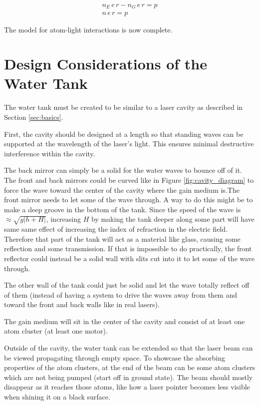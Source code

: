 \documentclass[12pt]{article}
\begin{document}
\begin{eqnarray}
    n_E\,e\,r -n_G\,e\,r = p
    \\
    n\,e\,r = p
\end{eqnarray}

The model for atom-light interactions is now complete.

\section{Design Considerations of the Water Tank}\label{sec:tank-design}

The water tank must be created to be similar to a laser cavity as described in Section \ref{sec:basics}.

First, the cavity should be designed at a length so that standing waves can be supported at the wavelength of the laser's light. This ensures minimal destructive interference within the cavity.

The back mirror can simply be a solid for the water waves to bounce off of it. The front and back mirrors could be curved like in Figure \ref{fig:cavity_diagram} to force the wave toward the center of the cavity where the gain medium is.The front mirror needs to let some of the wave through. A way to do this might be to make a deep groove in the bottom of the tank. Since the speed of the wave is $\approx \sqrt{g |h+H|}$, increasing $H$ by making the tank deeper along some part will have same same effect of increasing the index of refraction in the electric field. Therefore that part of the tank will act as a material like glass, causing some reflection and some transmission. If that is impossible to do practically, the front reflector could instead be a solid wall with slits cut into it to let some of the wave through.

The other wall of the tank could just be solid and let the wave totally reflect off of them (instead of having a system to drive the waves away from them and toward the front and back walls like in real lasers).

The gain medium will sit in the center of the cavity and consist of at least one atom cluster (at least one motor).

Outside of the cavity, the water tank can be extended so that the laser beam can be viewed propagating through empty space. To showcase the absorbing properties of the atom clusters, at the end of the beam can be some atom clusters which are not being pumped (start off in ground state). The beam should mostly disappear as it reaches those atoms, like how a laser pointer becomes less visible when shining it on a black surface.
\end{document}
